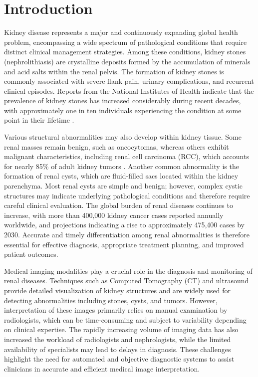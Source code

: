 \documentclass[preprint,12pt]{elsarticle}
\begin{document}
\section{Introduction}
\label{sec:intro}
Kidney disease represents a major and continuously expanding global health problem, encompassing a wide spectrum of pathological conditions that require distinct clinical management strategies. Among these conditions, kidney stones (nephrolithiasis) are crystalline deposits formed by the accumulation of minerals and acid salts within the renal pelvis. The formation of kidney stones is commonly associated with severe flank pain, urinary complications, and recurrent clinical episodes. Reports from the National Institutes of Health indicate that the prevalence of kidney stones has increased considerably during recent decades, with approximately one in ten individuals experiencing the condition at some point in their lifetime \cite{scales2012prevalence}. 

Various structural abnormalities may also develop within kidney tissue. Some renal masses remain benign, such as oncocytomas, whereas others exhibit malignant characteristics, including renal cell carcinoma (RCC), which accounts for nearly 85\% of adult kidney tumors \cite{wang2022web}. Another common abnormality is the formation of renal cysts, which are fluid-filled sacs located within the kidney parenchyma. Most renal cysts are simple and benign; however, complex cystic structures may indicate underlying pathological conditions and therefore require careful clinical evaluation. The global burden of renal diseases continues to increase, with more than 400,000 kidney cancer cases reported annually worldwide, and projections indicating a rise to approximately 475,400 cases by 2030. Accurate and timely differentiation among renal abnormalities is therefore essential for effective diagnosis, appropriate treatment planning, and improved patient outcomes.

Medical imaging modalities play a crucial role in the diagnosis and monitoring of renal diseases. Techniques such as Computed Tomography (CT) and ultrasound provide detailed visualization of kidney structures and are widely used for detecting abnormalities including stones, cysts, and tumors. However, interpretation of these images primarily relies on manual examination by radiologists, which can be time-consuming and subject to variability depending on clinical expertise. The rapidly increasing volume of imaging data has also increased the workload of radiologists and nephrologists, while the limited availability of specialists may lead to delays in diagnosis. These challenges highlight the need for automated and objective diagnostic systems to assist clinicians in accurate and efficient medical image interpretation.
\end{document}
